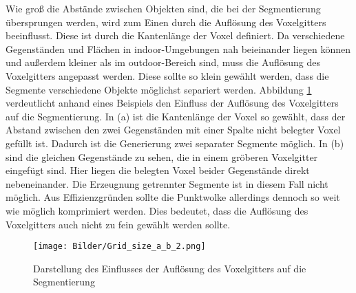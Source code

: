 Wie groß die Abstände zwischen Objekten sind, die bei der Segmentierung übersprungen werden, wird zum Einen durch die Auflösung des Voxelgitters beeinflusst. Diese ist durch die Kantenlänge der Voxel definiert. Da verschiedene Gegenständen und Flächen in indoor-Umgebungen nah beieinander liegen können und außerdem kleiner als im outdoor-Bereich sind, muss die Auflösung des Voxelgitters angepasst werden. Diese sollte so klein gewählt werden, dass die Segmente verschiedene Objekte möglichst separiert werden. Abbildung \ref{fig:Voxel} verdeutlicht anhand eines Beispiels den Einfluss der Auflösung des Voxelgitters auf die Segmentierung. In (a) ist die Kantenlänge der Voxel so gewählt, dass der Abstand zwischen den zwei Gegenständen mit einer Spalte nicht belegter Voxel gefüllt ist. Dadurch ist die Generierung zwei separater Segmente möglich. In (b) sind die gleichen Gegenstände zu sehen, die in einem gröberen Voxelgitter eingefügt sind. Hier liegen die belegten Voxel beider Gegenstände direkt nebeneinander. Die Erzeugnung getrennter Segmente ist in diesem Fall nicht möglich. Aus Effizienzgründen sollte die Punktwolke allerdings dennoch so weit wie möglich komprimiert werden. Dies bedeutet, dass die Auflösung des Voxelgitters auch nicht zu fein gewählt werden sollte.  

\begin{figure}
	\centering
	\texttt{[image: Bilder/Grid\_size\_a\_b\_2.png]}
	\caption{Darstellung des Einflusses der Auflösung des Voxelgitters auf die Segmentierung}
	\label{fig:Voxel}
\end{figure}



